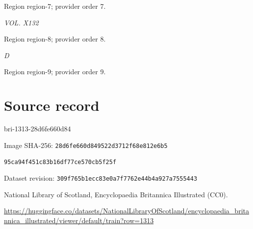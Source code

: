 \documentclass[11pt]{article}
\begin{document}
{\scriptsize\color{gray} Region region-7; provider order 7.\par}
\medskip

{\small\itshape VOL. X132\par}

{\scriptsize\color{gray} Region region-8; provider order 8.\par}
\medskip

{\small\itshape D\par}

{\scriptsize\color{gray} Region region-9; provider order 9.\par}
\medskip
\newpage\section*{Source record}
bri-1313-28d6fe660d84\par
Image SHA-256: \texttt{28d6fe660d849522d3712f68e812e6b5}\par\texttt{95ca94f451c83b16df77ce570cb5f25f}\par
Dataset revision: \texttt{309f765b1ecc83e0a7f7}\texttt{762e44b4a927a7555443}\par
National Library of Scotland, Encyclopaedia Britannica Illustrated (CC0).\par
\url{https://huggingface.co/datasets/NationalLibraryOfScotland/encyclopaedia_britannica_illustrated/viewer/default/train?row=1313}
\end{document}
